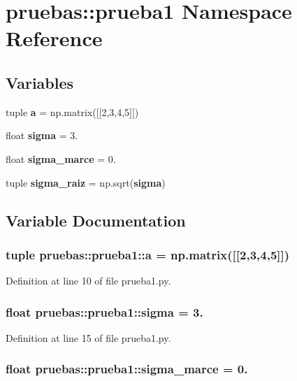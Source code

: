 \section{pruebas\-:\-:prueba1 \-Namespace \-Reference}
\label{namespacepruebas_1_1prueba1}
\subsection*{\-Variables}
\begin{DoxyCompactItemize}
\item 
tuple {\bf a} = np.\-matrix([[2,3,4,5]])
\item 
float {\bf sigma} = 3.
\item 
float {\bf sigma\-\_\-marce} = 0.
\item 
tuple {\bf sigma\-\_\-raiz} = np.\-sqrt({\bf sigma})
\end{DoxyCompactItemize}


\subsection{\-Variable \-Documentation}
\subsubsection[{a}]{\setlength{\rightskip}{0pt plus 5cm}tuple {\bf pruebas\-::prueba1\-::a} = np.\-matrix([[2,3,4,5]])}\label{namespacepruebas_1_1prueba1_ac4cf67fad4a4d421f1c038cb321d6057}


\-Definition at line 10 of file prueba1.\-py.

\subsubsection[{sigma}]{\setlength{\rightskip}{0pt plus 5cm}float {\bf pruebas\-::prueba1\-::sigma} = 3.}\label{namespacepruebas_1_1prueba1_a91005f255a932c60a077fc7f184a5d5f}


\-Definition at line 15 of file prueba1.\-py.

\subsubsection[{sigma\-\_\-marce}]{\setlength{\rightskip}{0pt plus 5cm}float {\bf pruebas\-::prueba1\-::sigma\-\_\-marce} = 0.}\label{namespacepruebas_1_1prueba1_a465eee67fb7be71777bb90ba32c958ae}


